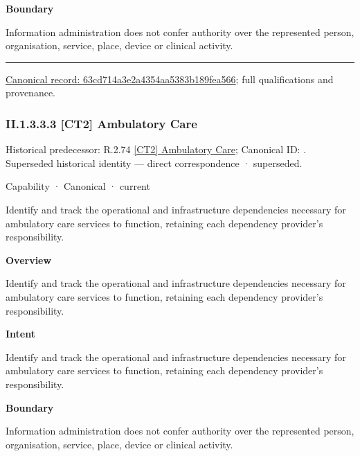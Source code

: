 \textbf{Boundary}



Information administration does not confer authority over the represented person, organisation, service, place, device or clinical activity.



\medskip\hrule\medskip

{\footnotesize \href{../../../../../../../continuum/strategy/capability/63cd714a3e2a4354aa5383b189fea566.md}{Canonical record: 63cd714a3e2a4354aa5383b189fea566}; full qualifications and provenance.}\par
\subsubsection*{II.1.3.3.3 [CT2] Ambulatory Care}
\label{navigation:II.1.3.3.3}

{\small Historical predecessor: R.2.74 \hyperref[element:e996b61b6e7b4619913f427aed2b55b1]{[CT2] Ambulatory Care}; Canonical ID: \texttt{}. Superseded historical identity — direct correspondence · superseded.}\par
\label{element:f74d7c3a39c540c4b462576e8f09fc58}
{\small Capability · Canonical · current}\par

Identify and track the operational and infrastructure dependencies necessary for ambulatory care services to function, retaining each dependency provider's responsibility.



\textbf{Overview}



Identify and track the operational and infrastructure dependencies necessary for ambulatory care services to function, retaining each dependency provider's responsibility.



\textbf{Intent}



Identify and track the operational and infrastructure dependencies necessary for ambulatory care services to function, retaining each dependency provider's responsibility.



\textbf{Boundary}



Information administration does not confer authority over the represented person, organisation, service, place, device or clinical activity.



